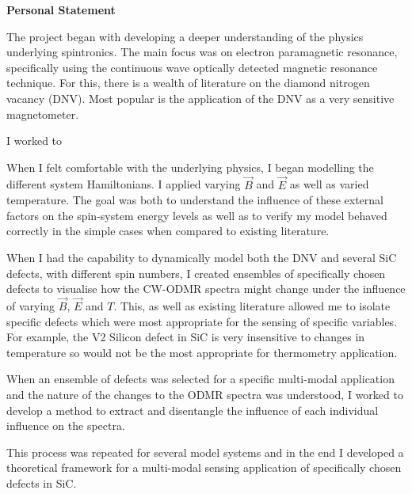 \begin{center}
\textbf{Personal Statement}
\end{center}

%
The project began with developing a deeper understanding of the physics underlying spintronics. 
The main focus was on electron paramagnetic resonance, specifically using the continuous wave optically detected magnetic resonance technique. For this, there is a wealth of literature on the diamond nitrogen vacancy (DNV). Most popular is the application of the DNV as a very sensitive magnetometer. 

I worked to  

When I felt comfortable with the underlying physics, I began modelling the different system Hamiltonians. I applied varying $\vec{B}$ and $\vec{E}$ as well as varied temperature. The goal was both to understand the influence of these external factors on the spin-system energy levels as well as to verify my model behaved correctly in the simple cases when compared to existing literature. 

When I had the capability to dynamically model both the DNV and several SiC defects, with different spin numbers, I created ensembles of specifically chosen defects to visualise how the CW-ODMR spectra might change under the influence of varying $\vec{B}$, $\vec{E}$ and $T$. This, as well as existing literature allowed me to isolate specific defects which were most appropriate for the sensing of specific variables. 
For example, the V2 Silicon defect in SiC is very insensitive to changes in temperature so would not be the most appropriate for thermometry application. 

When an ensemble of defects was selected for a specific multi-modal application and the nature of the changes to the ODMR spectra was understood, I worked to develop a method to extract and disentangle the influence of each individual influence on the spectra. 

This process was repeated for several model systems and in the end I developed a theoretical framework for a multi-modal sensing application of specifically chosen defects in SiC. 

